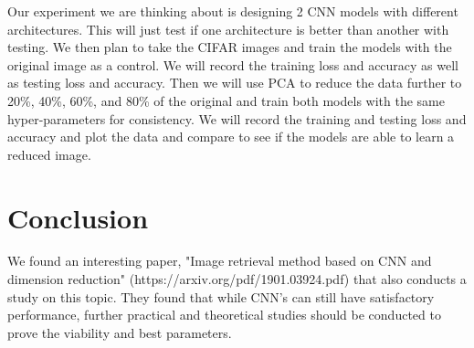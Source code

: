 \documentclass{article}
\begin{document}
Our experiment we are thinking about is designing 2 CNN models with different architectures. This will just test if one architecture is better than another with testing. We then plan to take the CIFAR images and train the models with the original image as a control. We will record the training loss and accuracy as well as testing loss and accuracy. Then we will use PCA to reduce the data further to 20\%, 40\%, 60\%, and 80\% of the original and train both models with the same hyper-parameters for consistency. We will record the training and testing loss and accuracy and plot the data and compare to see if the models are able to learn a reduced image. 

\section{Conclusion}

We found an interesting paper, "Image retrieval method based on CNN and
dimension reduction" (https://arxiv.org/pdf/1901.03924.pdf) that also conducts a study on this topic. They found that while CNN's can still have satisfactory performance, further practical and theoretical studies should be conducted to prove the viability and best parameters. 
\end{document}
